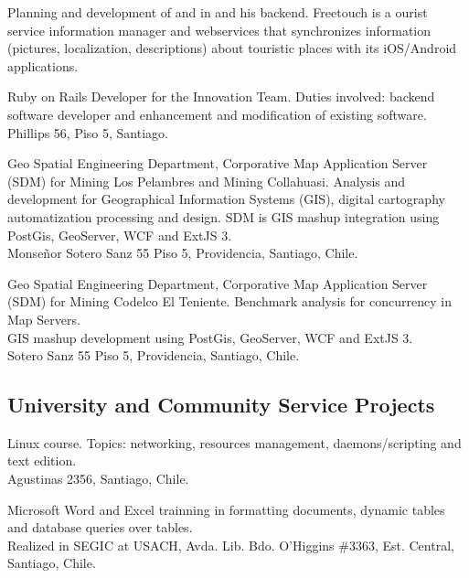 \documentclass[11pt,letterpaper,roman]{moderncv}
\begin{document}
	 {\scd} {\mataveri} {\stgo} {}
	{Planning and development of \freetouchchile and \freetouchperu in
	\android and his backend.  Freetouch is a ourist service information manager and
	webservices that synchronizes information (pictures, localization, descriptions)
	about touristic places with its iOS/Android applications.}
	
	 {\se} {\multicaja} {\stgo} {}
	{Ruby on Rails Developer for the Innovation Team. Duties involved:
	backend software developer and enhancement and modification of existing
	software. \\
	Phillips 56, Piso 5, Santiago.}

	 {\se} {\ikom} {\stgo} {} {Geo Spatial Engineering
	Department, Corporative Map Application Server (SDM) for Mining Los Pelambres
	and Mining Collahuasi.  Analysis and development for Geographical Information
	Systems (GIS), digital cartography automatization processing and design.  SDM is
	GIS mashup integration using PostGis, GeoServer, WCF and ExtJS 3. \\ Monse\~nor
	Sotero Sanz 55 Piso 5, Providencia, Santiago, Chile.}

	 {\intership} {\ikom} {\stgo} {}
	{Geo Spatial Engineering Department, Corporative Map Application Server
	(SDM) for  Mining Codelco El Teniente.  Benchmark analysis for concurrency in
	Map Servers. \\
	GIS mashup development using PostGis, GeoServer, WCF and ExtJS 3. \\ Sotero Sanz
	55 Piso 5, Providencia, Santiago, Chile.}

\subsection{University and Community Service Projects}

	 {\tchr} {\ipgamma} {\stgo} {}
	{\sence Linux course. Topics: networking, resources management,
	daemons/scripting and text edition.\\ Agustinas 2356, Santiago, Chile.}

	 {\tchr} {\otecnewline} {\stgo} {}
	{\sence Microsoft Word and Excel trainning in formatting documents,
	dynamic tables and database queries over tables. \\
	Realized in SEGIC at USACH, Avda. Lib. Bdo. O'Higgins \#3363, Est.
	Central, Santiago, Chile.}
\end{document}
